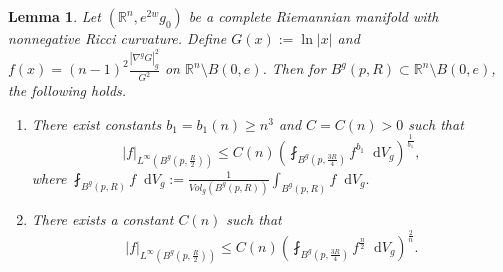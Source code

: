 \documentclass[10pt,a4paper]{amsart}
\newtheorem{lemma}[theorem]{Lemma}
\numberwithin{equation}{section}
\newcommand{\dd}{\mathop{}\!\mathrm{d}}%
\begin{document}
\begin{lemma}\label{lemma. weak Harnack ineq. for grad G}
    Let $(\mathbb{R}^n,e^{2w}g_0)$ be a complete Riemannian manifold with nonnegative Ricci curvature. Define $G(x):=\ln |x|$ and $f(x)=(n-1)^2\frac{|\nabla^g G|_g^2}{G^2}$ on $\mathbb{R}^n\setminus B(0,e)$. Then for $B^g(p,R)\subset \mathbb{R}^n\setminus B(0,e)$, the following holds.
    \begin{enumerate}
        \item There exist constants $b_1=b_1(n)\geq n^3$ and $C=C(n)>0$ such that
        \[
            |f|_{L^{\infty}(B^g(p,\frac{R}{2}))}
            \leq C(n)
            \left(
            \fint_{B^g(p,\frac{3R}{4})}f^{b_1}\dd V_g
            \right)^{\frac{1}{b_1}},
        \]
        where $\fint_{B^g(p,R)}f\dd V_g:=\frac{1}{Vol_g(B^g(p,R))}\int_{B^g(p,R)}f\dd V_g.$
        \item There exists a constant $C(n)$  such that
        \[
            |f|_{L^{\infty}(B^g(p,\frac{R}{2}))}
            \leq C(n)
            \left(
            \fint_{B^g(p,\frac{3R}{4})}f^{\frac{n}{2}}\dd V_g
            \right)^{\frac{2}{n}}.
        \]
    \end{enumerate}
\end{lemma}
\end{document}
